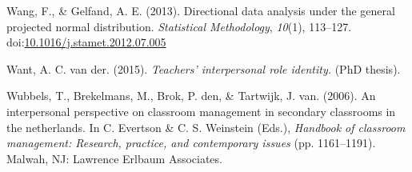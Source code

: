 \documentclass[11pt,]{article}
\begin{document}
\hypertarget{ref-wang2012directional}{}
Wang, F., \& Gelfand, A. E. (2013). Directional data analysis under the
general projected normal distribution. \emph{Statistical Methodology},
\emph{10}(1), 113--127.
doi:\href{https://doi.org/10.1016/j.stamet.2012.07.005}{10.1016/j.stamet.2012.07.005}

\hypertarget{ref-vanderWant2015role}{}
Want, A. C. van der. (2015). \emph{Teachers' interpersonal role
identity.} (PhD thesis).

\hypertarget{ref-wubbels2006interpersonal}{}
Wubbels, T., Brekelmans, M., Brok, P. den, \& Tartwijk, J. van. (2006).
An interpersonal perspective on classroom management in secondary
classrooms in the netherlands. In C. Evertson \& C. S. Weinstein (Eds.),
\emph{Handbook of classroom management: Research, practice, and
contemporary issues} (pp. 1161--1191). Malwah, NJ: Lawrence Erlbaum
Associates.

\newpage
\end{document}

